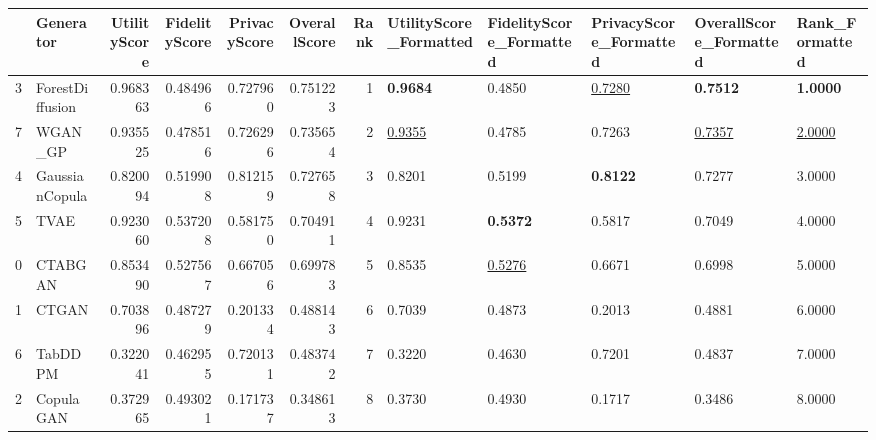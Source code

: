 \begin{tabular}{llrrrrrlllll}
\toprule
 & Generator & UtilityScore & FidelityScore & PrivacyScore & OverallScore & Rank & UtilityScore_Formatted & FidelityScore_Formatted & PrivacyScore_Formatted & OverallScore_Formatted & Rank_Formatted \\
\midrule
3 & ForestDiffusion & 0.968363 & 0.484966 & 0.727960 & 0.751223 & 1 & \textbf{0.9684} & 0.4850 & \underline{0.7280} & \textbf{0.7512} & \textbf{1.0000} \\
7 & WGAN_GP & 0.935525 & 0.478516 & 0.726296 & 0.735654 & 2 & \underline{0.9355} & 0.4785 & 0.7263 & \underline{0.7357} & \underline{2.0000} \\
4 & GaussianCopula & 0.820094 & 0.519908 & 0.812159 & 0.727658 & 3 & 0.8201 & 0.5199 & \textbf{0.8122} & 0.7277 & 3.0000 \\
5 & TVAE & 0.923060 & 0.537208 & 0.581750 & 0.704911 & 4 & 0.9231 & \textbf{0.5372} & 0.5817 & 0.7049 & 4.0000 \\
0 & CTABGAN & 0.853490 & 0.527567 & 0.667056 & 0.699783 & 5 & 0.8535 & \underline{0.5276} & 0.6671 & 0.6998 & 5.0000 \\
1 & CTGAN & 0.703896 & 0.487279 & 0.201334 & 0.488143 & 6 & 0.7039 & 0.4873 & 0.2013 & 0.4881 & 6.0000 \\
6 & TabDDPM & 0.322041 & 0.462955 & 0.720131 & 0.483742 & 7 & 0.3220 & 0.4630 & 0.7201 & 0.4837 & 7.0000 \\
2 & CopulaGAN & 0.372965 & 0.493021 & 0.171737 & 0.348613 & 8 & 0.3730 & 0.4930 & 0.1717 & 0.3486 & 8.0000 \\
\bottomrule
\end{tabular}
